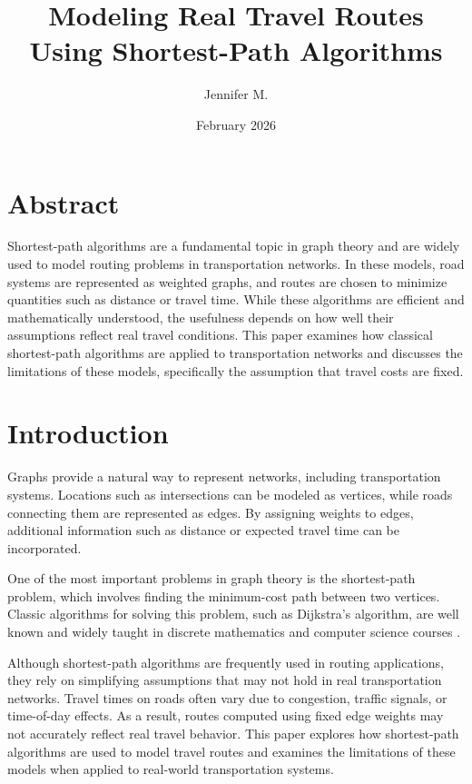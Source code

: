 \documentclass{article}
\title{Modeling Real Travel Routes Using Shortest-Path Algorithms}
\author{Jennifer M.}
\date{February 2026}
\begin{document}
\maketitle

\section{Abstract}
Shortest-path algorithms are a fundamental topic in graph theory and are widely used to model routing problems in transportation networks. In these models, road systems are represented as weighted graphs, and routes are chosen to minimize quantities such as distance or travel time. While these algorithms are efficient and mathematically understood, the usefulness depends on how well their assumptions reflect real travel conditions. This paper examines how classical shortest-path algorithms are applied to transportation networks and discusses the limitations of these models, specifically the assumption that travel costs are fixed.  

\section{Introduction}
Graphs provide a natural way to represent networks, including transportation systems. Locations such as intersections can be modeled as vertices, while roads connecting them are represented as edges. By assigning weights to edges, additional information such as distance or expected travel time can be incorporated. 

One of the most important problems in graph theory is the shortest-path problem, which involves finding the minimum-cost path between two vertices. Classic algorithms for solving this problem, such as Dijkstra’s algorithm, are well known and widely taught in discrete mathematics and computer science courses \cite{cormen_leiserson_rivest_stein_2022} \cite{tardos_2006}. 

Although shortest-path algorithms are frequently used in routing applications, they rely on simplifying assumptions that may not hold in real transportation networks. Travel times on roads often vary due to congestion, traffic signals, or time-of-day effects. As a result, routes computed using fixed edge weights may not accurately reflect real travel behavior. This paper explores how shortest-path algorithms are used to model travel routes and examines the limitations of these models when applied to real-world transportation systems. 
\end{document}
